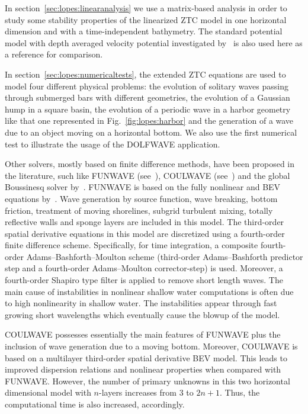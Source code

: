 In section~\ref{sec:lopes:linearanalysis}
we use a matrix-based analysis in order to
study some stability properties of the linearized ZTC model
in one horizontal dimension and with a time-independent
bathymetry. The standard potential model with depth averaged velocity
potential investigated by~\cite{LovholtPedersen2009} is also
used here as a reference for comparison.

In section~\ref{sec:lopes:numericaltests}, the extended ZTC
equations are used to model four different physical
problems: the evolution of  solitary waves passing through
submerged bars with different geometries,
the evolution of a Gaussian hump in a
square basin, the evolution of a periodic wave in a harbor
geometry like that one represented in
Fig.~\ref{fig:lopes:harbor} and the generation of a wave due
to an object moving on a horizontal bottom.  We also use the
first numerical test to illustrate the usage of the DOLFWAVE
application.

Other solvers, mostly based on finite difference methods,
have been proposed in the literature, such
like FUNWAVE (see~\cite{Kirby1998}), COULWAVE
(see~\cite{LynettLiu2004}) and the global Boussinesq solver
by~\cite{PedersenLovholt2008}.  FUNWAVE  is based on the
fully nonlinear and BEV  equations by~\cite{WeiKirby1995}.
Wave generation by source function, wave breaking, bottom friction, treatment of
moving shorelines, subgrid turbulent mixing, totally
reflective walls and sponge layers are included in this
model.
The third-order spatial derivative equations in this model are discretized using a
fourth-order finite difference scheme.
Specifically, for time integration, a composite fourth-order
Adams--Bashforth--Moulton scheme (third-order Adams--Bashforth
predictor step and a fourth-order Adams--Moulton corrector-step)
is used.
Moreover, a fourth-order Shapiro type filter is applied to remove short length
waves.
The main cause of instabilities in
nonlinear shallow water computations
is often due to high nonlinearity in shallow water.
The instabilities appear through fast growing short
wavelengths which eventually cause the blowup of the model.



COULWAVE possesses essentially the main features of FUNWAVE
plus the inclusion of wave generation due to a moving
bottom.  Moreover, COULWAVE is based on a multilayer
third-order spatial derivative BEV model.  This leads to
improved dispersion relations and nonlinear properties when
compared with FUNWAVE.  However, the number of primary
unknowns in this two horizontal dimensional model with
$n$-layers increases from $3$ to $2n+1$. Thus, the
computational time is also increased, accordingly.


